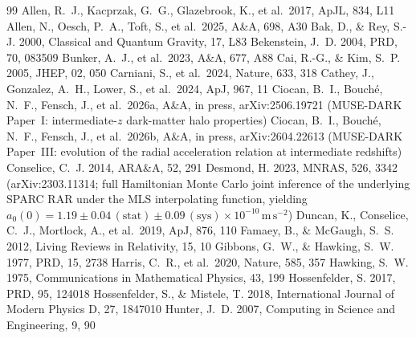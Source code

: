 \documentclass[twocolumn,letterpaper]{aastex631}
\newcommand{\azero}{a_0}
\begin{document}
\begin{thebibliography}{99}
  Allen, R.~J., Kacprzak, G.~G., Glazebrook, K., et al.\ 2017, ApJL,
  834, L11
  Allen, N., Oesch, P.~A., Toft, S., et al.\ 2025, A\&A,
  698, A30
  Bak, D., \& Rey, S.-J. 2000, Classical and Quantum Gravity,
  17, L83
  Bekenstein, J.~D. 2004, PRD, 70, 083509
  Bunker, A.~J., et al.\ 2023, A\&A, 677, A88
  Cai, R.-G., \& Kim, S.~P. 2005, JHEP, 02, 050
  Carniani, S., et al.\ 2024, Nature, 633, 318
  Cathey, J., Gonzalez, A.~H., Lower, S., et al.\ 2024, ApJ,
  967, 11
  Ciocan, B.~I., Bouch\'e, N.~F., Fensch, J., et al.\ 2026a,
  A\&A, in press, arXiv:2506.19721 (MUSE-DARK Paper~I:
  intermediate-$z$ dark-matter halo properties)
  Ciocan, B.~I., Bouch\'e, N.~F., Fensch, J., et al.\ 2026b,
  A\&A, in press, arXiv:2604.22613 (MUSE-DARK Paper~III:
  evolution of the radial acceleration relation at
  intermediate redshifts)
  Conselice, C.~J. 2014, ARA\&A, 52, 291
  Desmond, H. 2023, MNRAS, 526, 3342 (arXiv:2303.11314; full
  Hamiltonian Monte Carlo joint inference of the underlying
  SPARC RAR under the MLS interpolating function, yielding
  $\azero(0)\!=\!1.19\!\pm\!0.04\,(\mathrm{stat})
  \!\pm\!0.09\,(\mathrm{sys})\!\times\!10^{-10}\,
  \mathrm{m\,s^{-2}}$)
  Duncan, K., Conselice, C.~J., Mortlock, A., et al.\ 2019, ApJ,
  876, 110
  Famaey, B., \& McGaugh, S.~S. 2012, Living Reviews in Relativity,
  15, 10
  Gibbons, G.~W., \& Hawking, S.~W. 1977, PRD, 15, 2738
  Harris, C.~R., et al.\ 2020, Nature, 585, 357
  Hawking, S.~W. 1975, Communications in Mathematical Physics,
  43, 199
  Hossenfelder, S. 2017, PRD, 95, 124018
  Hossenfelder, S., \& Mistele, T. 2018, International Journal of
  Modern Physics D, 27, 1847010
  Hunter, J.~D. 2007, Computing in Science and Engineering, 9, 90

\end{thebibliography}
\end{document}
